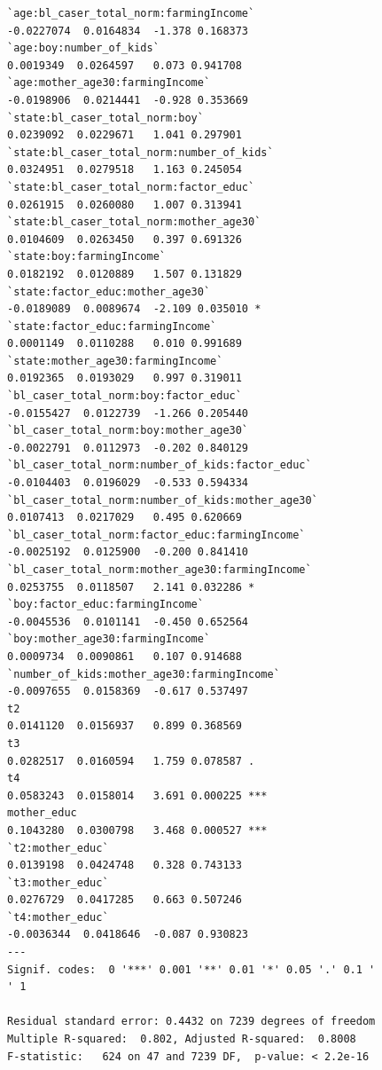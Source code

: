\documentclass{article}
\begin{document}
\begin{figure}[H]
\begin{lstlisting}[style=RstyleCommentSmall, caption=CATE with Controls selected by LASSO]
`age:bl_caser_total_norm:farmingIncome`           -0.0227074  0.0164834  -1.378 0.168373    
`age:boy:number_of_kids`                           0.0019349  0.0264597   0.073 0.941708    
`age:mother_age30:farmingIncome`                  -0.0198906  0.0214441  -0.928 0.353669    
`state:bl_caser_total_norm:boy`                    0.0239092  0.0229671   1.041 0.297901    
`state:bl_caser_total_norm:number_of_kids`         0.0324951  0.0279518   1.163 0.245054    
`state:bl_caser_total_norm:factor_educ`            0.0261915  0.0260080   1.007 0.313941    
`state:bl_caser_total_norm:mother_age30`           0.0104609  0.0263450   0.397 0.691326    
`state:boy:farmingIncome`                          0.0182192  0.0120889   1.507 0.131829    
`state:factor_educ:mother_age30`                  -0.0189089  0.0089674  -2.109 0.035010 *  
`state:factor_educ:farmingIncome`                  0.0001149  0.0110288   0.010 0.991689    
`state:mother_age30:farmingIncome`                 0.0192365  0.0193029   0.997 0.319011    
`bl_caser_total_norm:boy:factor_educ`             -0.0155427  0.0122739  -1.266 0.205440    
`bl_caser_total_norm:boy:mother_age30`            -0.0022791  0.0112973  -0.202 0.840129    
`bl_caser_total_norm:number_of_kids:factor_educ`  -0.0104403  0.0196029  -0.533 0.594334    
`bl_caser_total_norm:number_of_kids:mother_age30`  0.0107413  0.0217029   0.495 0.620669    
`bl_caser_total_norm:factor_educ:farmingIncome`   -0.0025192  0.0125900  -0.200 0.841410    
`bl_caser_total_norm:mother_age30:farmingIncome`   0.0253755  0.0118507   2.141 0.032286 *  
`boy:factor_educ:farmingIncome`                   -0.0045536  0.0101141  -0.450 0.652564    
`boy:mother_age30:farmingIncome`                   0.0009734  0.0090861   0.107 0.914688    
`number_of_kids:mother_age30:farmingIncome`       -0.0097655  0.0158369  -0.617 0.537497    
t2                                                 0.0141120  0.0156937   0.899 0.368569    
t3                                                 0.0282517  0.0160594   1.759 0.078587 .  
t4                                                 0.0583243  0.0158014   3.691 0.000225 ***
mother_educ                                        0.1043280  0.0300798   3.468 0.000527 ***
`t2:mother_educ`                                   0.0139198  0.0424748   0.328 0.743133    
`t3:mother_educ`                                   0.0276729  0.0417285   0.663 0.507246    
`t4:mother_educ`                                  -0.0036344  0.0418646  -0.087 0.930823    
---
Signif. codes:  0 '***' 0.001 '**' 0.01 '*' 0.05 '.' 0.1 ' ' 1

Residual standard error: 0.4432 on 7239 degrees of freedom
Multiple R-squared:  0.802,	Adjusted R-squared:  0.8008 
F-statistic:   624 on 47 and 7239 DF,  p-value: < 2.2e-16
\end{lstlisting}
\end{figure}
\end{document}
